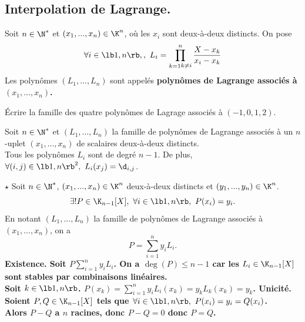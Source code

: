 \documentclass[11pt]{article}
\begin{document}
\vspace*{-0.8cm}

\subsection{Interpolation de Lagrange.}

\begin{defi}{}{}
    Soit $n\in\N^*$ et $(x_1,...,x_n)\in\K^n$, où les $x_i$ sont deux-à-deux distincts. On pose
    \begin{equation*}
        \forall i \in \lb1,n\rb,, ~ L_i = \prod_{\substack{k=1}\\k\neq i}^n\frac{X-x_k}{x_i-x_k}
    \end{equation*}
    Les polynômes $(L_1,...,L_n)$ sont appelés \bf{polynômes de Lagrange} associés à $(x_1,...,x_n)$.
\end{defi}

\vspace*{-0.8cm}

\begin{ex}{}{}
    Écrire la famille des quatre polynômes de Lagrage associés à $(-1,0,1,2)$.
\end{ex}

\vspace*{-0.8cm}

\begin{prop}{}{}
    Soit $n\in\N^*$ et $(L_1,...,L_n)$ la famille de polynômes de Lagrange associés à un $n$-uplet $(x_1,...,x_n)$ de scalaires deux-à-deux distincts.\\
    Tous les polynômes $L_i$ sont de degré $n-1$. De plus, $\forall (i,j)\in\lb1,n\rb^2,~L_i(x_j)=\d_{i,j}$.
\end{prop}

\vspace*{-0.8cm}

\begin{thm}{$\star$}{}
    Soit $n\in\N^*$, $(x_1,...,x_n)\in\K^n$ deux-à-deux distincts et $(y_1,...,y_n)\in\K^n$.
    \begin{equation*}
        \exists!P\in\K_{n-1}[X], ~ \forall i \in \lb1,n\rb, ~ P(x_i)=y_i.
    \end{equation*}
    En notant $(L_1,...,L_n)$ la famille de polynômes de Lagrange associés à $(x_1,...,x_n)$, on a
    \begin{equation*}
        P=\sum_{i=1}^ny_iL_i.
    \end{equation*}
    \tcblower
    \bf{Existence.} Soit $P\sum_{i=1}^ny_iL_i$. On a $\deg(P)\leq n-1$ car les $L_i\in\K_{n-1}[X]$ sont stables par combinaisons linéaires.\\
    Soit $k\in\lb1,n\rb$. $P(x_k)=\sum_{i=1}^ny_iL_i(x_k)=y_kL_k(x_k)=y_k$.\n
    \bf{Unicité.} Soient $P,Q\in\K_{n-1}[X]$ tels que $\forall i \in \lb1,n\rb, ~ P(x_i)=y_i=Q(x_i)$.\\
    Alors $P-Q$ a $n$ racines, donc $P-Q=0$ donc $P=Q$.
\end{thm}
\end{document}
